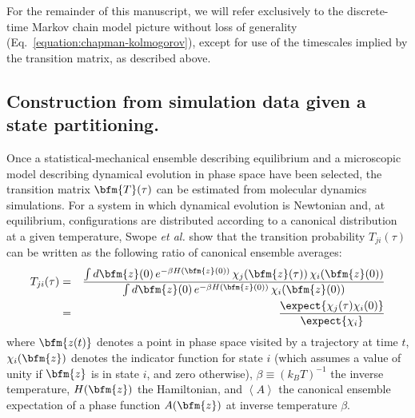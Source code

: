 For the remainder of this manuscript, we will refer exclusively to the discrete-time Markov chain model picture without loss of generality (Eq.\ \ref{equation:chapman-kolmogorov}), except for use of the timescales implied by the transition matrix, as described above.

\subsection{Construction from simulation data given a state partitioning.}
\label{section:theory:construction-from-simulation-data}

Once a statistical-mechanical ensemble describing equilibrium and a microscopic model describing dynamical evolution in phase space have been selected, the transition matrix $\bfm{T}(\tau)$ can be estimated from molecular dynamics simulations.
For a system in which dynamical evolution is Newtonian and, at equilibrium, configurations are distributed according to a canonical distribution at a given temperature, Swope \emph{et al.}\cite{swope:2004a} show that the transition probability $T_{ji}(\tau)$ can be written as the following ratio of canonical ensemble averages:
\begin{eqnarray}
T_{ji}(\tau) 
&=& \frac{\int d\bfm{z}(0) \, e^{-\beta H(\bfm{z}(0))} \, \chi_j(\bfm{z}(\tau)) \, \chi_i(\bfm{z}(0))}{\int d\bfm{z}(0) \, e^{-\beta H(\bfm{z}(0))} \, \chi_i(\bfm{z}(0))} \label{equation:transition-element-phase-space-integrals} \\
&=& \frac{\expect{\chi_j(\tau) \chi_i(0)}}{\expect{\chi_i}} \label{equation:transition-element-correlation-functions}
\end{eqnarray}
where $\bfm{z(t)}$ denotes a point in phase space visited by a trajectory at time $t$, 
$\chi_i(\bfm{z})$ denotes the indicator function for state $i$ (which assumes a value of unity if $\bfm{z}$ is in state $i$, and zero otherwise),
$\beta \equiv (k_B T)^{-1}$ the inverse temperature, $H(\bfm{z})$ the Hamiltonian, and $\left< A \right>$ the canonical ensemble expectation of a phase function $A(\bfm{z})$ at inverse temperature $\beta$.


